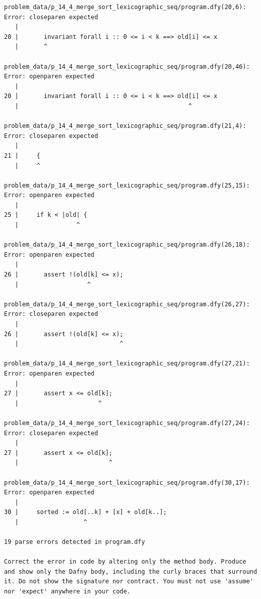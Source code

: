 \documentclass{article}
\begin{document}
\begin{lstlisting}
problem_data/p_14_4_merge_sort_lexicographic_seq/program.dfy(20,6): Error: closeparen expected
   |
20 |       invariant forall i :: 0 <= i < k ==> old[i] <= x
   |       ^

problem_data/p_14_4_merge_sort_lexicographic_seq/program.dfy(20,46): Error: openparen expected
   |
20 |       invariant forall i :: 0 <= i < k ==> old[i] <= x
   |                                               ^

problem_data/p_14_4_merge_sort_lexicographic_seq/program.dfy(21,4): Error: closeparen expected
   |
21 |     {
   |     ^

problem_data/p_14_4_merge_sort_lexicographic_seq/program.dfy(25,15): Error: openparen expected
   |
25 |     if k < |old| {
   |                ^

problem_data/p_14_4_merge_sort_lexicographic_seq/program.dfy(26,18): Error: openparen expected
   |
26 |       assert !(old[k] <= x);
   |                   ^

problem_data/p_14_4_merge_sort_lexicographic_seq/program.dfy(26,27): Error: closeparen expected
   |
26 |       assert !(old[k] <= x);
   |                            ^

problem_data/p_14_4_merge_sort_lexicographic_seq/program.dfy(27,21): Error: openparen expected
   |
27 |       assert x <= old[k];
   |                      ^

problem_data/p_14_4_merge_sort_lexicographic_seq/program.dfy(27,24): Error: closeparen expected
   |
27 |       assert x <= old[k];
   |                         ^

problem_data/p_14_4_merge_sort_lexicographic_seq/program.dfy(30,17): Error: openparen expected
   |
30 |     sorted := old[..k] + [x] + old[k..];
   |                  ^

19 parse errors detected in program.dfy

Correct the error in code by altering only the method body. Produce and show only the Dafny body, including the curly braces that surround it. Do not show the signature nor contract. You must not use 'assume' nor 'expect' anywhere in your code.
\end{lstlisting}
\end{document}

